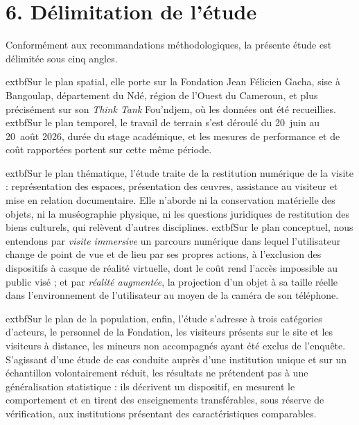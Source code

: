 \section*{6. Délimitation de l'étude}

Conformément aux recommandations méthodologiques, la présente étude est
délimitée sous cinq angles.

	extbf{Sur le plan spatial}, elle porte sur la Fondation Jean Félicien Gacha,
sise à Bangoulap, département du Ndé, région de l'Ouest du Cameroun, et plus
précisément sur son \emph{Think Tank} Fou'ndjem, où les données ont été
recueillies. 	extbf{Sur le plan temporel}, le travail de terrain s'est déroulé
du 20~juin au 20~août 2026, durée du stage académique, et les mesures de
performance et de coût rapportées portent sur cette même période.

	extbf{Sur le plan thématique}, l'étude traite de la restitution numérique de
la visite : représentation des espaces, présentation des œuvres, assistance au
visiteur et mise en relation documentaire. Elle n'aborde ni la conservation
matérielle des objets, ni la muséographie physique, ni les questions juridiques
de restitution des biens culturels, qui relèvent d'autres disciplines.
	extbf{Sur le plan conceptuel}, nous entendons par \emph{visite immersive} un
parcours numérique dans lequel l'utilisateur change de point de vue et de lieu
par ses propres actions, à l'exclusion des dispositifs à casque de réalité
virtuelle, dont le coût rend l'accès impossible au public visé ; et par
\emph{réalité augmentée}, la projection d'un objet à sa taille réelle dans
l'environnement de l'utilisateur au moyen de la caméra de son téléphone.

	extbf{Sur le plan de la population}, enfin, l'étude s'adresse à trois
catégories d'acteurs, le personnel de la Fondation, les visiteurs présents sur
le site et les visiteurs à distance, les mineurs non accompagnés ayant été
exclus de l'enquête. S'agissant d'une étude de cas conduite auprès d'une
institution unique et sur un échantillon volontairement réduit, les résultats ne
prétendent pas à une généralisation statistique : ils décrivent un dispositif,
en mesurent le comportement et en tirent des enseignements transférables, sous
réserve de vérification, aux institutions présentant des caractéristiques
comparables.
